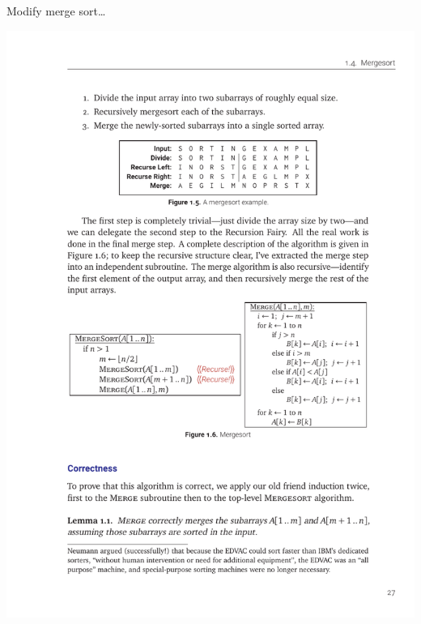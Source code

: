 \documentclass[12pt]{article}
\begin{document}
Modify merge sort\dots

\includegraphics[scale=1.5]{w04-mergesort.pdf}\\~
\end{document}
